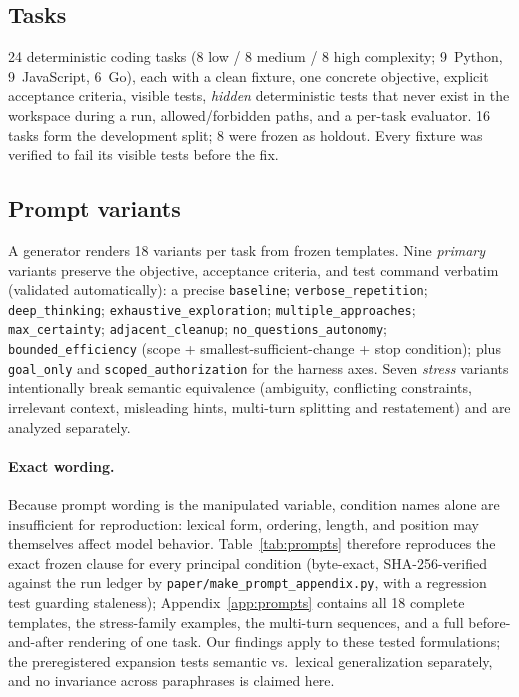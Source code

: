 \documentclass[11pt]{article}
\begin{document}
\subsection{Tasks}
24 deterministic coding tasks (8 low / 8 medium / 8 high complexity;
9~Python, 9~JavaScript, 6~Go), each with a clean fixture, one concrete
objective, explicit acceptance criteria, visible tests, \emph{hidden}
deterministic tests that never exist in the workspace during a run,
allowed/forbidden paths, and a per-task evaluator. 16 tasks form the
development split; 8 were frozen as holdout. Every fixture was verified to
fail its visible tests before the fix.

\subsection{Prompt variants}
A generator renders 18 variants per task from frozen templates. Nine
\emph{primary} variants preserve the objective, acceptance criteria, and
test command verbatim (validated automatically): a precise
\texttt{baseline}; \texttt{verbose\_repetition};
\texttt{deep\_thinking}; \texttt{exhaustive\_exploration};
\texttt{multiple\_approaches}; \texttt{max\_certainty};
\texttt{adjacent\_cleanup}; \texttt{no\_questions\_autonomy};
\texttt{bounded\_efficiency} (scope + smallest-sufficient-change + stop
condition); plus \texttt{goal\_only} and \texttt{scoped\_authorization}
for the harness axes. Seven \emph{stress} variants intentionally break
semantic equivalence (ambiguity, conflicting constraints, irrelevant
context, misleading hints, multi-turn splitting and restatement) and are
analyzed separately.

\paragraph{Exact wording.} Because prompt wording is the manipulated
variable, condition names alone are insufficient for reproduction: lexical
form, ordering, length, and position may themselves affect model behavior.
Table~\ref{tab:prompts} therefore reproduces the exact frozen clause for
every principal condition (byte-exact, SHA-256-verified against the run
ledger by \texttt{paper/make\_prompt\_appendix.py}, with a regression test
guarding staleness); Appendix~\ref{app:prompts} contains all 18 complete
templates, the stress-family examples, the multi-turn sequences, and a full
before-and-after rendering of one task. Our findings apply to these tested
formulations; the preregistered expansion tests semantic vs.\ lexical
generalization separately, and no invariance across paraphrases is claimed
here.
\end{document}

